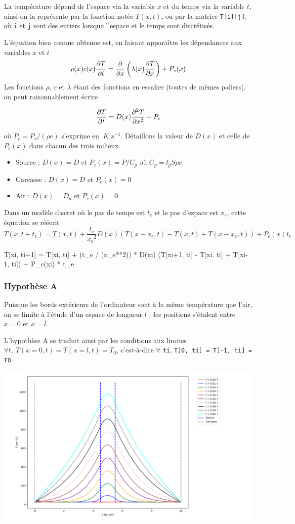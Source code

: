 \documentclass{article}
\newcommand{\p}{\texttt} %
\begin{document}
La température dépend de l'espace via la variable $x$ et du temps via la variable $t$, ainsi on la représente par la fonction notée $T(x, t)$, ou par la matrice \p{T[i][j]}, où \p{i} et \p{j} sont des entiers lorsque l'espace et le temps sont discrétisés.

L'équation bien connue obtenue est, en faisant apparaître les dépendances aux variables $x$ et $t$
$$\rho(x) c(x) \pdv{T}{t} = \pdv{x} \left( \lambda (x) \pdv{T}{x} \right) + P_v(x)$$
Les fonctions $\rho$, $c$ et $\lambda$ étant des fonctions en escalier (toutes de mêmes paliers), on peut raisonnablement écrire

$$\pdv{T}{t} = D(x) \pdv[2]{T}{x} + P_c$$

où $P_c = P_v / (\rho c)$ s'exprime en $\SI{}{K.s^{-1}}$. Détaillons la valeur de $D(x)$ et celle de $P_c(x)$ dans chacun des trois milieux.
\begin{itemize}
    \item Source : $D(x) = D$ et $P_c(x) = P / C_p$ où $C_p = l_p S \rho c$
    \item Carcasse : $D(x) = D$ et $P_c(x) = 0$
    \item Air : $D(x) = D_a$ et $P_c(x) = 0$
\end{itemize}

Dans un modèle discret où le pas de temps est $t_e$ et le pas d'espace est $x_e$,  cette équation se réécrit
$$T(x, t+t_e) = T(x, t) + \frac{t_e}{{x_e}^2} D(x)
    \left( T(x+x_e, t) - T(x, t) + T(x-x_e, t) \right)
    + P_c(x) t_e$$

\begin{python}
T[xi, ti+1] = T[xi, ti] + (t_e / (x_e**2)) * D(xi)
    (T[xi+1, ti] - T[xi, ti] + T[xi-1, ti])
    + P_c(xi) * t_e
\end{python}

\subsubsection{Hypothèse A}

Puisque les bords extérieurs de l'ordinateur sont à la même température que l'air, on se limite à l'étude d'un espace de longueur $l$ : les positions s'étalent entre $x = 0$ et $x = l$.

L'hypothèse A se traduit ainsi par les conditions aux limites $\forall t,~T(x=0, t) = T(x=l, t) = T_0$, c'est-à-dire $\forall$ \p{ti}, \p{T[0, ti] = T[-1, ti] = T0}.

\includegraphics[scale=0.37]{1dA_P500mW_t11s.png}
\end{document}
